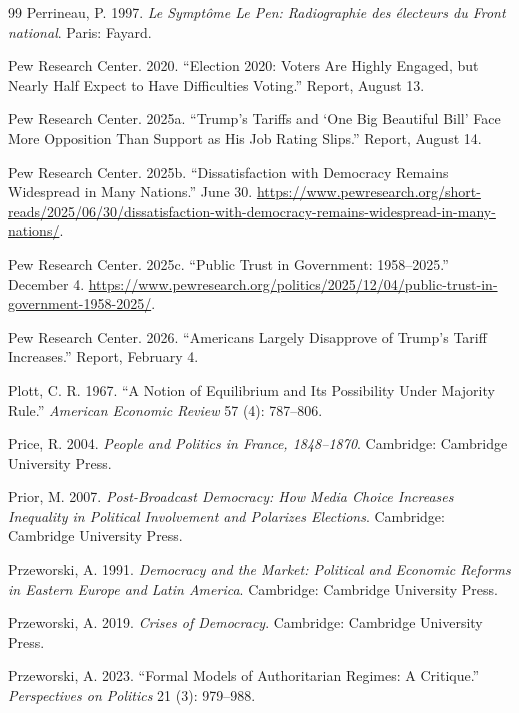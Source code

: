 \documentclass[12pt,letterpaper]{article}
\begin{document}
\begin{thebibliography}{99}
Perrineau, P. 1997. \textit{Le Sympt\^{o}me Le Pen: Radiographie des \'{e}lecteurs du Front national}. Paris: Fayard.

Pew Research Center. 2020. ``Election 2020: Voters Are Highly Engaged, but Nearly Half Expect to Have Difficulties Voting.'' Report, August 13.

Pew Research Center. 2025a. ``Trump's Tariffs and `One Big Beautiful Bill' Face More Opposition Than Support as His Job Rating Slips.'' Report, August 14.

Pew Research Center. 2025b. ``Dissatisfaction with Democracy Remains Widespread in Many Nations.'' June 30. \url{https://www.pewresearch.org/short-reads/2025/06/30/dissatisfaction-with-democracy-remains-widespread-in-many-nations/}.

Pew Research Center. 2025c. ``Public Trust in Government: 1958--2025.'' December 4. \url{https://www.pewresearch.org/politics/2025/12/04/public-trust-in-government-1958-2025/}.

Pew Research Center. 2026. ``Americans Largely Disapprove of Trump's Tariff Increases.'' Report, February 4.

Plott, C. R. 1967. ``A Notion of Equilibrium and Its Possibility Under Majority Rule.'' \textit{American Economic Review} 57 (4): 787--806.

Price, R. 2004. \textit{People and Politics in France, 1848--1870}. Cambridge: Cambridge University Press.

Prior, M. 2007. \textit{Post-Broadcast Democracy: How Media Choice Increases Inequality in Political Involvement and Polarizes Elections}. Cambridge: Cambridge University Press.

Przeworski, A. 1991. \textit{Democracy and the Market: Political and Economic Reforms in Eastern Europe and Latin America}. Cambridge: Cambridge University Press.

Przeworski, A. 2019. \textit{Crises of Democracy}. Cambridge: Cambridge University Press.

Przeworski, A. 2023. ``Formal Models of Authoritarian Regimes: A Critique.'' \textit{Perspectives on Politics} 21 (3): 979--988.


\end{thebibliography}
\end{document}
